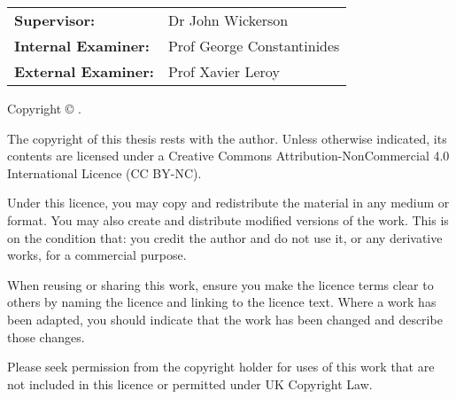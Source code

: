 
\thispagestyle{empty}

\noindent\begin{tabular}{ll}
  \textbf{Supervisor:} & Dr John Wickerson\\
  \textbf{Internal Examiner:} & Prof George Constantinides\\
  \textbf{External Examiner:} & Prof Xavier Leroy\\
\end{tabular}

\vfill

\makeatletter
\noindent Copyright \copyright{} \the\year{} \@author.
\makeatother

\vspace{3\baselineskip}

\begingroup\singlespacing
\noindent The copyright of this thesis rests with the author. Unless otherwise indicated, its contents are licensed under a Creative Commons Attribution-NonCommercial 4.0 International Licence (CC BY-NC).

Under this licence, you may copy and redistribute the material in any medium or format. You may also create and distribute modified versions of the work. This is on the condition that: you credit the author and do not use it, or any derivative works, for a commercial purpose.

When reusing or sharing this work, ensure you make the licence terms clear to others by naming the licence and linking to the licence text. Where a work has been adapted, you should indicate that the work has been changed and describe those changes.

Please seek permission from the copyright holder for uses of this work that are not included in this licence or permitted under UK Copyright Law.
\endgroup

%
%

